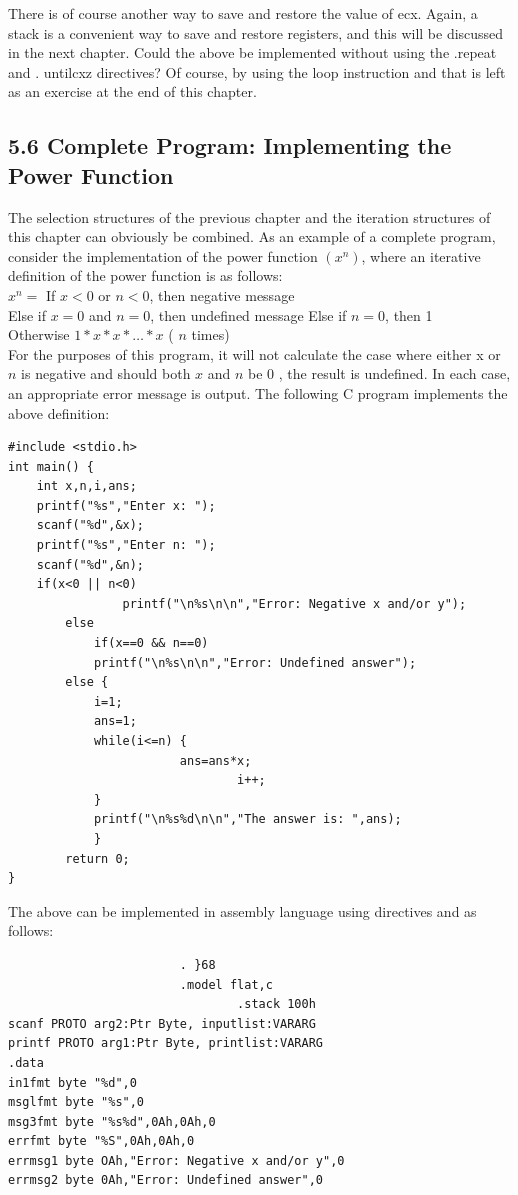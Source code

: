 \documentclass[10pt]{article}
\begin{document}
There is of course another way to save and restore the value of ecx. Again, a stack is a convenient way to save and restore registers, and this will be discussed in the next chapter. Could the above be implemented without using the .repeat and . untilcxz directives? Of course, by using the loop instruction and that is left as an exercise at the end of this chapter.

\subsection*{5.6 Complete Program: Implementing the Power Function}
The selection structures of the previous chapter and the iteration structures of this chapter can obviously be combined. As an example of a complete program, consider the implementation of the power function $\left(x^{n}\right)$, where an iterative definition of the power function is as follows:\\
$x^{n}=$ If $x<0$ or $n<0$, then negative message\\
Else if $x=0$ and $n=0$, then undefined message Else if $n=0$, then 1\\
Otherwise $1 * x * x * \ldots * x$ ( $n$ times)\\
For the purposes of this program, it will not calculate the case where either x or $n$ is negative and should both $x$ and $n$ be 0 , the result is undefined. In each case, an appropriate error message is output. The following C program implements the above definition:

\begin{verbatim}
#include <stdio.h>
int main() {
    int x,n,i,ans;
    printf("%s","Enter x: ");
    scanf("%d",&x);
    printf("%s","Enter n: ");
    scanf("%d",&n);
    if(x<0 || n<0)
                printf("\n%s\n\n","Error: Negative x and/or y");
        else
            if(x==0 && n==0)
            printf("\n%s\n\n","Error: Undefined answer");
        else {
            i=1;
            ans=1;
            while(i<=n) {
                        ans=ans*x;
                                i++;
            }
            printf("\n%s%d\n\n","The answer is: ",ans);
            }
        return 0;
}
\end{verbatim}

The above can be implemented in assembly language using directives and as follows:

\begin{verbatim}
                        . }68
                        .model flat,c
                                .stack 100h
scanf PROTO arg2:Ptr Byte, inputlist:VARARG
printf PROTO arg1:Ptr Byte, printlist:VARARG
.data
in1fmt byte "%d",0
msglfmt byte "%s",0
msg3fmt byte "%s%d",0Ah,0Ah,0
errfmt byte "%S",0Ah,0Ah,0
errmsg1 byte OAh,"Error: Negative x and/or y",0
errmsg2 byte 0Ah,"Error: Undefined answer",0
\end{verbatim}
\end{document}

